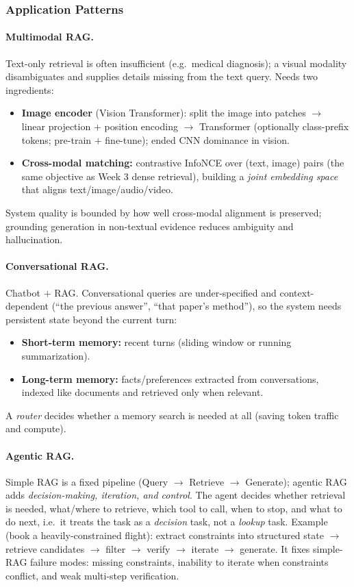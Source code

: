 \documentclass{article}
\begin{document}
\subsubsection{Application Patterns}
\paragraph{Multimodal RAG.} Text-only retrieval is often insufficient (e.g.\ medical diagnosis); a visual modality disambiguates and supplies details missing from the text query. Needs two ingredients:
\begin{itemize}
    \item \textbf{Image encoder} (Vision Transformer): split the image into patches $\rightarrow$ linear projection $+$ position encoding $\rightarrow$ Transformer (optionally class-prefix tokens; pre-train $+$ fine-tune); ended CNN dominance in vision.
    \item \textbf{Cross-modal matching:} contrastive InfoNCE over (text, image) pairs (the same objective as Week 3 dense retrieval), building a \textit{joint embedding space} that aligns text/image/audio/video.
\end{itemize}
System quality is bounded by how well cross-modal alignment is preserved; grounding generation in non-textual evidence reduces ambiguity and hallucination.

\paragraph{Conversational RAG.} Chatbot $+$ RAG. Conversational queries are under-specified and context-dependent (``the previous answer'', ``that paper's method''), so the system needs persistent state beyond the current turn:
\begin{itemize}
    \item \textbf{Short-term memory:} recent turns (sliding window or running summarization).
    \item \textbf{Long-term memory:} facts/preferences extracted from conversations, indexed like documents and retrieved only when relevant.
\end{itemize}
A \textit{router} decides whether a memory search is needed at all (saving token traffic and compute).

\paragraph{Agentic RAG.} Simple RAG is a fixed pipeline (Query $\rightarrow$ Retrieve $\rightarrow$ Generate); agentic RAG adds \textit{decision-making, iteration, and control}. The agent decides whether retrieval is needed, what/where to retrieve, which tool to call, when to stop, and what to do next, i.e.\ it treats the task as a \textit{decision} task, not a \textit{lookup} task. Example (book a heavily-constrained flight): extract constraints into structured state $\rightarrow$ retrieve candidates $\rightarrow$ filter $\rightarrow$ verify $\rightarrow$ iterate $\rightarrow$ generate. It fixes simple-RAG failure modes: missing constraints, inability to iterate when constraints conflict, and weak multi-step verification.
\end{document}
